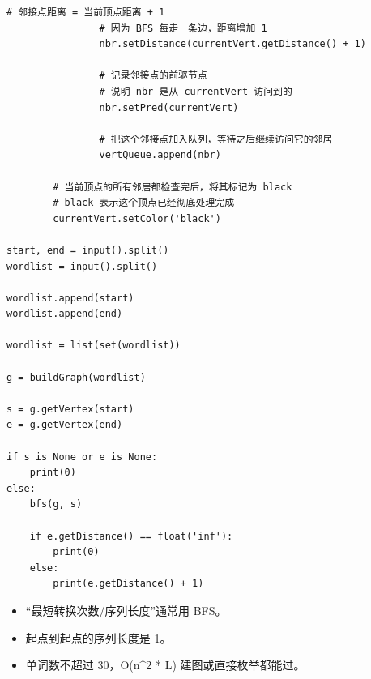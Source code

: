 \documentclass[10pt,a4paper,fontset=none]{ctexart}
\begin{document}
\begin{lstlisting}[style=py,caption={最终可用代码（对话来源）}]
                # 邻接点距离 = 当前顶点距离 + 1
                # 因为 BFS 每走一条边，距离增加 1
                nbr.setDistance(currentVert.getDistance() + 1)

                # 记录邻接点的前驱节点
                # 说明 nbr 是从 currentVert 访问到的
                nbr.setPred(currentVert)

                # 把这个邻接点加入队列，等待之后继续访问它的邻居
                vertQueue.append(nbr)

        # 当前顶点的所有邻居都检查完后，将其标记为 black
        # black 表示这个顶点已经彻底处理完成
        currentVert.setColor('black')

start, end = input().split()
wordlist = input().split()

wordlist.append(start)
wordlist.append(end)

wordlist = list(set(wordlist))

g = buildGraph(wordlist)

s = g.getVertex(start)
e = g.getVertex(end)

if s is None or e is None:
    print(0)
else:
    bfs(g, s)

    if e.getDistance() == float('inf'):
        print(0)
    else:
        print(e.getDistance() + 1)
\end{lstlisting}
\begin{notebox}
\begin{itemize}
  \item “最短转换次数/序列长度”通常用 BFS。
  \item 起点到起点的序列长度是 1。
  \item 单词数不超过 30，O(n\textasciicircum{}2 * L) 建图或直接枚举都能过。
\end{itemize}
\end{notebox}
\end{document}
